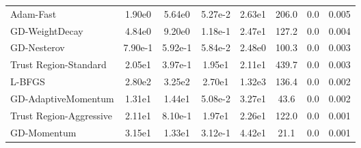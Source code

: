 \documentclass{article}
\begin{document}
\begin{table}[htbp]
{\begin{tabular}{p{2.5cm}*{7}{c}}
Adam-Fast & 1.90e0 & 5.64e0 & 5.27e-2 & 2.63e1 & 206.0 & 0.0 & 0.005 \\
GD-WeightDecay & 4.84e0 & 9.20e0 & 1.18e-1 & 2.47e1 & 127.2 & 0.0 & 0.004 \\
GD-Nesterov & 7.90e-1 & 5.92e-1 & 5.84e-2 & 2.48e0 & 100.3 & 0.0 & 0.003 \\
Trust Region-Standard & 2.05e1 & 3.97e-1 & 1.95e1 & 2.11e1 & 439.7 & 0.0 & 0.003 \\
L-BFGS & 2.80e2 & 3.25e2 & 2.70e1 & 1.32e3 & 136.4 & 0.0 & 0.002 \\
GD-AdaptiveMomentum & 1.31e1 & 1.44e1 & 5.08e-2 & 3.27e1 & 43.6 & 0.0 & 0.002 \\
Trust Region-Aggressive & 2.11e1 & 8.10e-1 & 1.97e1 & 2.26e1 & 122.0 & 0.0 & 0.001 \\
GD-Momentum & 3.15e1 & 1.33e1 & 3.12e-1 & 4.42e1 & 21.1 & 0.0 & 0.001 \\
\bottomrule
\end{tabular}
}
\end{table}
\end{document}
